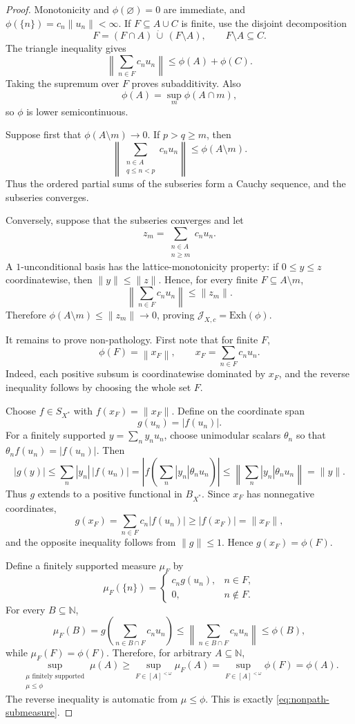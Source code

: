 \documentclass[11pt]{article}
\theoremstyle{definition}
\theoremstyle{remark}
\newcommand{\N}{\mathbb N}
\newcommand{\J}{\mathcal J}
\newcommand{\Exh}{\mathrm{Exh}}
\begin{document}
\begin{proof}
Monotonicity and $\phi(\varnothing)=0$ are immediate, and
$\phi(\{n\})=c_n\|u_n\|<\infty$.  If $F\subseteq A\cup C$ is finite, use the
disjoint decomposition
\[
 F=(F\cap A)\,\dot\cup\,(F\setminus A),
 \qquad F\setminus A\subseteq C.
\]
The triangle inequality gives
\[
 \left\|\sum_{n\in F}c_nu_n\right\|
 \leq \phi(A)+\phi(C).
\]
Taking the supremum over $F$ proves subadditivity.  Also
\[
 \phi(A)=\sup_m\phi(A\cap m),
\]
so $\phi$ is lower semicontinuous.

Suppose first that $\phi(A\setminus m)\to0$.  If $p>q\geq m$, then
\[
 \left\|\sum_{\substack{n\in A\\q\leq n<p}}c_nu_n\right\|
 \leq\phi(A\setminus m).
\]
Thus the ordered partial sums of the subseries form a Cauchy sequence, and the
subseries converges.

Conversely, suppose that the subseries converges and let
\[
 z_m=\sum_{\substack{n\in A\\n\geq m}}c_nu_n.
\]
A $1$-unconditional basis has the lattice-monotonicity property: if
$0\leq y\leq z$ coordinatewise, then $\|y\|\leq\|z\|$.  Hence, for every
finite $F\subseteq A\setminus m$,
\[
 \left\|\sum_{n\in F}c_nu_n\right\|\leq\|z_m\|.
\]
Therefore $\phi(A\setminus m)\leq\|z_m\|\to0$, proving
$\J_{X,c}=\Exh(\phi)$.

It remains to prove non-pathology.  First note that for finite $F$,
\begin{equation}\label{eq:finite-phi}
 \phi(F)=\left\|x_F\right\|,
 \qquad x_F=\sum_{n\in F}c_nu_n.
\end{equation}
Indeed, each positive subsum is coordinatewise dominated by $x_F$, and the
reverse inequality follows by choosing the whole set $F$.

Choose $f\in S_{X^*}$ with $f(x_F)=\|x_F\|$.  Define on the coordinate span
\[
 g(u_n)=|f(u_n)|.
\]
For a finitely supported $y=\sum_n y_nu_n$, choose unimodular scalars
$\theta_n$ so that $\theta_nf(u_n)=|f(u_n)|$.  Then
\[
 |g(y)|
 \leq\sum_n|y_n|\,|f(u_n)|
 =\left|f\left(\sum_n |y_n|\theta_nu_n\right)\right|
 \leq\left\|\sum_n |y_n|\theta_nu_n\right\|
 =\|y\|.
\]
Thus $g$ extends to a positive functional in $B_{X^*}$.  Since $x_F$ has
nonnegative coordinates,
\[
 g(x_F)=\sum_{n\in F}c_n|f(u_n)|
 \geq |f(x_F)|=\|x_F\|,
\]
and the opposite inequality follows from $\|g\|\leq1$.  Hence
$g(x_F)=\phi(F)$.

Define a finitely supported measure $\mu_F$ by
\[
 \mu_F(\{n\})=
 \begin{cases}
  c_ng(u_n),&n\in F,\\
  0,&n\notin F.
 \end{cases}
\]
For every $B\subseteq\N$,
\[
 \mu_F(B)
 =g\left(\sum_{n\in B\cap F}c_nu_n\right)
 \leq\left\|\sum_{n\in B\cap F}c_nu_n\right\|
 \leq\phi(B),
\]
while $\mu_F(F)=\phi(F)$.  Therefore, for arbitrary $A\subseteq\N$,
\[
 \sup_{\substack{\mu\text{ finitely supported}\\\mu\leq\phi}}\mu(A)
 \geq\sup_{F\in[A]^{<\omega}}\mu_F(A)
 =\sup_{F\in[A]^{<\omega}}\phi(F)
 =\phi(A).
\]
The reverse inequality is automatic from $\mu\leq\phi$.  This is exactly
\eqref{eq:nonpath-submeasure}.
\end{proof}
\end{document}

